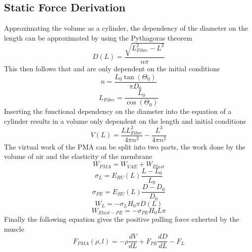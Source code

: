 \documentclass[11pt,a4paper]{article}
\begin{document}
\newpage
\begin{appendices}
\section{Static Force Derivation}
\label{sub:staticforcederive}
Approximating the volume as a cylinder, the dependency of the diameter on the length can be approximated by using the Pythagoras theorem 
\begin{equation}
    D(L) = \frac{\sqrt{L_{Fibre}^2-L^2}}{n \pi}
\end{equation}
This then follows that  and  are only dependent on the initial conditions
\begin{equation}
    n = \frac{L_0\tan(\Theta_0)}{\pi D_0}
    \label{math:diameterconst1}
\end{equation}
\begin{equation}
    L_{Fibre} = \frac{L_0}{\cos(\Theta_0)}
    \label{math:diameterconst2}
\end{equation}
Inserting the functional dependency on the diameter into the equation of a cylinder results in a volume only dependent on the length and initial conditions
\begin{equation}
    V(L) = \frac{L L_{Fibre}^2}{4 \pi n^2}-\frac{L^3}{4 \pi n^2}
\end{equation}
The virtual work of the PMA can be split into two parts, the work done by the volume of air and the elasticity of the membrane 
\begin{equation}
    W_{PMA} = W_{VAE} + W_{Elast}
\end{equation}
\begin{equation}
    \sigma_{L} = E_{RU}(L) \frac{L-L_0}{L_0}
\end{equation}
\begin{equation}
    \sigma_{PE} = E_{RU}(L) \frac{D-D_0}{D_0}
\end{equation}
\begin{equation}
    W_{L} = -\sigma_{L} H_0 \pi D(L)
\end{equation}
\begin{equation}
    W_{Elast-PE} = -\sigma_{PE} H_0 L \pi
\end{equation}
Finally the following equation gives the positive pulling force exherted by the muscle
\begin{equation}
    F_{PMA}(\rho, l) = -\rho \frac{dV}{dL}+F_{PE} \frac{dD}{dL}-F_L
    \label{math:staticforcederive}
\end{equation}


\end{appendices}
\end{document}
